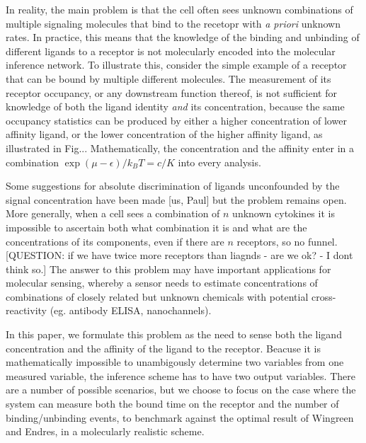 \documentclass[prl,showpacs]{revtex4}
\begin{document}
In reality, the main problem is that the cell often sees unknown combinations of multiple signaling molecules that bind to the recetopr with \textit{a priori} unknown rates. In practice, this means that the knowledge of the binding and unbinding of different ligands to a receptor is not molecularly encoded into the molecular inference network. To illustrate this, consider the simple example of a receptor that can be bound by multiple different molecules. The measurement of its receptor occupancy, or any downstream function thereof, is not sufficient for knowledge of both the ligand identity \emph{and} its concentration, because the same occupancy statistics can be produced by either a higher concentration of lower affinity ligand, or the lower concentration of the higher affinity ligand, as illustrated in Fig...  Mathematically, the concentration and the affinity enter in a combination $\exp(\mu-\epsilon)/k_BT=c/K$ into every analysis.

Some suggestions for absolute discrimination of ligands unconfounded by the signal concentration have been made [us, Paul] but the problem remains open. More generally, when a cell sees a combination of $n$ unknown cytokines it is impossible to ascertain both what combination it is and what are the concentrations of its components, even if there are $n$ receptors, so no funnel.[QUESTION: if we have twice more receptors than liagnds - are we ok? - I dont think so.] The answer to this problem may have important applications for molecular sensing, whereby a sensor needs to estimate concentrations of combinations of closely related but unknown chemicals with potential cross-reactivity (eg. antibody ELISA, nanochannels).

In this paper, we formulate this problem as the need to sense both the ligand concentration and the affinity of the ligand to the receptor. Beacuse it is mathematically impossible to unambigously determine two variables from one measured variable, the inference scheme has to have two output variables. There are a number of possible scenarios, but we choose to focus on the case where the system can measure both the bound time on the receptor and the number of binding/unbinding events, to benchmark against the optimal result of Wingreen and Endres, in a molecularly realistic scheme.
\end{document}
